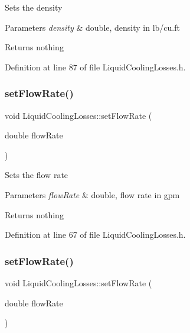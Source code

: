 Sets the density


\begin{DoxyParams}{Parameters}
{\em density} & double, density in lb/cu.\+ft\\
\hline
\end{DoxyParams}
\begin{DoxyReturn}{Returns}
nothing 
\end{DoxyReturn}


Definition at line 87 of file Liquid\+Cooling\+Losses.\+h.

\mbox{\label{class_liquid_cooling_losses_a7739742c5f21919a62c304b7c525b1b6}} 
\subsubsection{\texorpdfstring{set\+Flow\+Rate()}{setFlowRate()}\hspace{0.1cm}{\footnotesize\ttfamily [1/3]}}
{\footnotesize\ttfamily void Liquid\+Cooling\+Losses\+::set\+Flow\+Rate (\begin{DoxyParamCaption}\item[{double}]{flow\+Rate }\end{DoxyParamCaption})\hspace{0.3cm}{\ttfamily [inline]}}

Sets the flow rate


\begin{DoxyParams}{Parameters}
{\em flow\+Rate} & double, flow rate in gpm\\
\hline
\end{DoxyParams}
\begin{DoxyReturn}{Returns}
nothing 
\end{DoxyReturn}


Definition at line 67 of file Liquid\+Cooling\+Losses.\+h.

\mbox{\label{class_liquid_cooling_losses_a7739742c5f21919a62c304b7c525b1b6}} 
\subsubsection{\texorpdfstring{set\+Flow\+Rate()}{setFlowRate()}\hspace{0.1cm}{\footnotesize\ttfamily [2/3]}}
{\footnotesize\ttfamily void Liquid\+Cooling\+Losses\+::set\+Flow\+Rate (\begin{DoxyParamCaption}\item[{double}]{flow\+Rate }\end{DoxyParamCaption})\hspace{0.3cm}{\ttfamily [inline]}}

